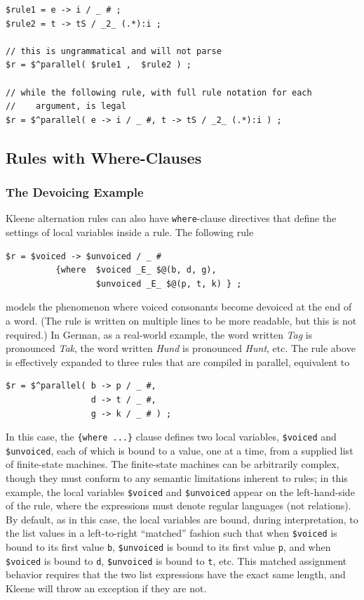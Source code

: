 \begin{Verbatim}
$rule1 = e -> i / _ # ;
$rule2 = t -> tS / _2_ (.*):i ;

// this is ungrammatical and will not parse
$r = $^parallel( $rule1 ,  $rule2 ) ;

// while the following rule, with full rule notation for each
//    argument, is legal
$r = $^parallel( e -> i / _ #, t -> tS / _2_ (.*):i ) ;
\end{Verbatim}

\subsection{Rules with Where-Clauses}

\subsubsection{The Devoicing Example}

Kleene alternation rules can also have \texttt{where}-clause directives that
define the settings of local variables inside a rule.  The following rule

\begin{Verbatim}
$r = $voiced -> $unvoiced / _ # 
          {where  $voiced _E_ $@(b, d, g), 
                  $unvoiced _E_ $@(p, t, k) } ;
\end{Verbatim}

\noindent
models the phenomenon where voiced consonants become devoiced at the end of a word.  
(The rule is written on multiple lines to be
more readable, but this is not required.) In German, as a real-world example, the word
written \emph{Tag} is pronounced \emph{Tak}, the word written \emph{Hund} is pronounced
\emph{Hunt}, etc.  The rule above is effectively expanded to
three rules that are compiled in parallel, equivalent to

\begin{Verbatim}
$r = $^parallel( b -> p / _ #, 
                 d -> t / _ #, 
                 g -> k / _ # ) ;
\end{Verbatim}

\noindent
In this case, the \texttt{\{where ...\}} clause defines two local variables,
\verb!$voiced! and \verb!$unvoiced!, each of which is bound to a value, one at a
time, from a supplied list of finite-state machines.  The finite-state machines can be
arbitrarily complex, though they must conform to any semantic limitations
inherent to rules; in this example, the local variables \verb!$voiced! and \verb!$unvoiced! appear on
the left-hand-side of the rule, where the expressions must denote regular
languages (not relations).  By default, as in this case, the local variables are
bound, during interpretation, to the list values in a left-to-right ``matched''
fashion such that when \verb!$voiced! is bound to its first value \verb!b!,
\verb!$unvoiced! is
bound to its first value \verb!p!, and when \verb!$voiced! is bound to \verb!d!,
\verb!$unvoiced!
is bound to \verb!t!, etc.  This matched assignment behavior requires that the
two list expressions have the exact same length, and Kleene will throw an
exception if they are not.  

